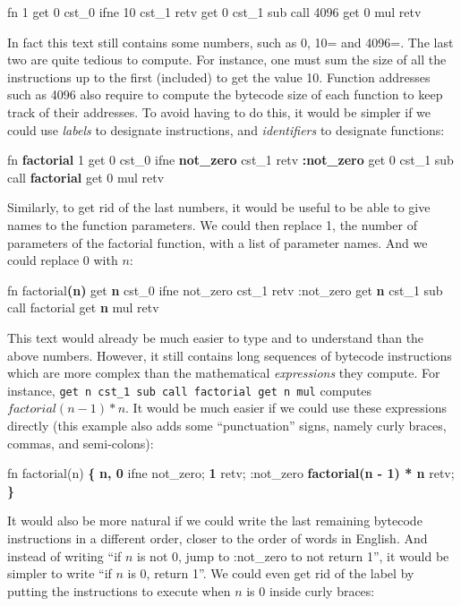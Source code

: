 \begin{Code}
fn 1
  get 0 cst_0 ifne 10 cst_1 retv
  get 0 cst_1 sub call 4096 get 0 mul retv
\end{Code}

In fact this text still contains some numbers, such as 0, 10= and
4096=. The last two are quite tedious to compute. For instance, one
must sum the size of all the instructions up to the first 
(included) to get the value 10. Function addresses such as 4096 also require to
compute the bytecode size of each function to keep track of their addresses. To
avoid having to do this, it would be simpler if we could use {\em labels} to
designate instructions, and {\em identifiers} to designate functions:

\begin{Code}
fn \textbf{factorial} 1
  get 0 cst_0 ifne \textbf{not_zero} cst_1 retv
  \textbf{:not_zero} get 0 cst_1 sub call \textbf{factorial} get 0 mul retv
\end{Code}

Similarly, to get rid of the last numbers, it would be useful to be able to
give names to the function parameters. We could then replace 1, the number of
parameters of the factorial function, with a list of parameter names. And we
could replace 0 with $n$:

\begin{Code}
fn factorial\textbf{(n)}
  get \textbf{n} cst_0 ifne not_zero cst_1 retv
  :not_zero get \textbf{n} cst_1 sub call factorial get \textbf{n} mul retv
\end{Code}

This text would already be much easier to type and to understand than the above
numbers. However, it still contains long sequences of bytecode instructions
which are more complex than the mathematical {\em expressions} they compute.
For instance, \verb!get n cst_1 sub call factorial get n mul! computes
$factorial(n-1)*n$. It would be much easier if we could use these expressions
directly (this example also adds some ``punctuation'' signs, namely curly
braces, commas, and semi-colons):

\begin{Code}
fn factorial(n) \textbf{\{}
  \textbf{n, 0} ifne not_zero; \textbf{1} retv;
  :not_zero \textbf{factorial(n - 1) * n} retv;
\textbf{\}}
\end{Code}

It would also be more natural if we could write the last remaining bytecode
instructions in a different order, closer to the order of words in English. And
instead of writing ``if $n$ is not 0, jump to :not\_zero to not return 1'', it
would be simpler to write ``if $n$ is 0, return 1''. We could even get rid of
the label by putting the instructions to execute when $n$ is 0 inside curly
braces:


